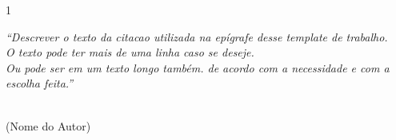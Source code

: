 \newpage
\thispagestyle{empty}
\begin{spacing}{1}
	\vspace*{\fill}

	\noindent\hfill\parbox{9cm}{
		\textit{``Descrever o texto da citacao utilizada na epígrafe desse template de trabalho.\\
			O texto pode ter mais de uma linha caso se deseje.\\
			Ou pode ser em um texto longo também. de acordo com a necessidade e com a escolha feita.''}
	}\\[2ex]
	\hspace*{\fill}(Nome do Autor)

\end{spacing}




